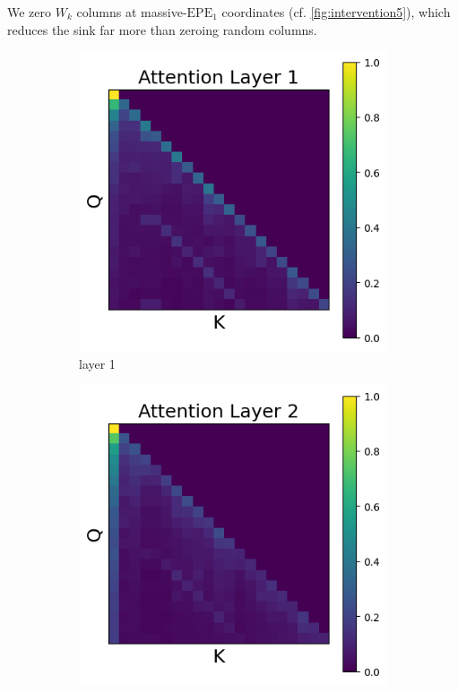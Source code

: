 \documentclass[11pt]{article}
\begin{document}
We zero $W_k$ columns at massive-$\mathrm{EPE}_1$ coordinates (cf. \cref{fig:intervention5}), which reduces the sink far more than zeroing random columns.
\begin{figure}[t]
  \begin{subfigure}[t]{0.24\textwidth}
    \centering
    \includegraphics[width=1.4\columnwidth]{figures/intervention5/layer_1.png}
    \caption{layer 1}
  \end{subfigure}\hfill
  \begin{subfigure}[t]{0.24\textwidth}
    \centering
    \includegraphics[width=1.4\columnwidth]{figures/intervention5/layer_2.png}

\end{subfigure}
\end{figure}
\end{document}
